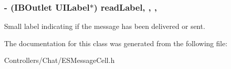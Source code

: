 \subsubsection[{read\+Label}]{\setlength{\rightskip}{0pt plus 5cm}-\/ (I\+B\+Outlet U\+I\+Label$\ast$) read\+Label\hspace{0.3cm}{\ttfamily [read]}, {\ttfamily [write]}, {\ttfamily [nonatomic]}, {\ttfamily [strong]}}\label{interface_e_s_message_cell_aa596cb979f7178f1e259aff80297423b}
Small label indicating if the message has been delivered or sent. 

The documentation for this class was generated from the following file\+:\begin{DoxyCompactItemize}
\item 
Controllers/\+Chat/E\+S\+Message\+Cell.\+h\end{DoxyCompactItemize}
